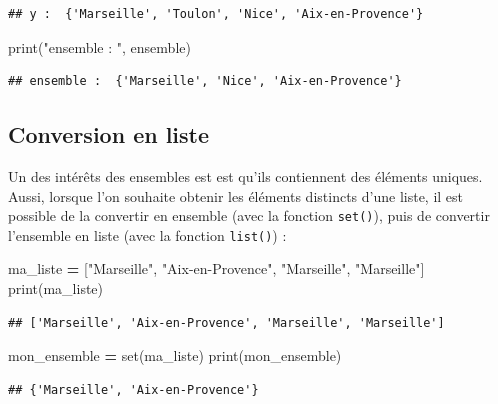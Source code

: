 \documentclass[12pt,]{book}
\newenvironment{Shaded}{\begin{snugshade}}{\end{snugshade}}
\newcommand{\StringTok}[1]{\textcolor[rgb]{0.31,0.60,0.02}{#1}}
\newcommand{\OperatorTok}[1]{\textcolor[rgb]{0.81,0.36,0.00}{\textbf{#1}}}
\newcommand{\BuiltInTok}[1]{#1}
\newcommand{\NormalTok}[1]{#1}
\numberwithin{equation}{section}
\numberwithin{countremarque}{section}
\begin{document}
\begin{lstlisting}
## y :  {'Marseille', 'Toulon', 'Nice', 'Aix-en-Provence'}
\end{lstlisting}

\begin{Shaded}
\begin{Highlighting}[]
\BuiltInTok{print}\NormalTok{(}\StringTok{"ensemble : "}\NormalTok{, ensemble)}
\end{Highlighting}
\end{Shaded}

\begin{lstlisting}
## ensemble :  {'Marseille', 'Nice', 'Aix-en-Provence'}
\end{lstlisting}

\subsection{Conversion en liste}\label{conversion-en-liste}

Un des intérêts des ensembles est est qu'ils contiennent des éléments
uniques. Aussi, lorsque l'on souhaite obtenir les éléments distincts
d'une liste, il est possible de la convertir en ensemble (avec la
fonction \texttt{set()}), puis de convertir l'ensemble en liste (avec la
fonction \texttt{list()}) :

\begin{Shaded}
\begin{Highlighting}[]
\NormalTok{ma_liste }\OperatorTok{=}\NormalTok{ [}\StringTok{"Marseille"}\NormalTok{, }\StringTok{"Aix-en-Provence"}\NormalTok{, }\StringTok{"Marseille"}\NormalTok{, }\StringTok{"Marseille"}\NormalTok{]}
\BuiltInTok{print}\NormalTok{(ma_liste)}
\end{Highlighting}
\end{Shaded}

\begin{lstlisting}
## ['Marseille', 'Aix-en-Provence', 'Marseille', 'Marseille']
\end{lstlisting}

\begin{Shaded}
\begin{Highlighting}[]
\NormalTok{mon_ensemble }\OperatorTok{=} \BuiltInTok{set}\NormalTok{(ma_liste)}
\BuiltInTok{print}\NormalTok{(mon_ensemble)}
\end{Highlighting}
\end{Shaded}

\begin{lstlisting}
## {'Marseille', 'Aix-en-Provence'}
\end{lstlisting}
\end{document}
